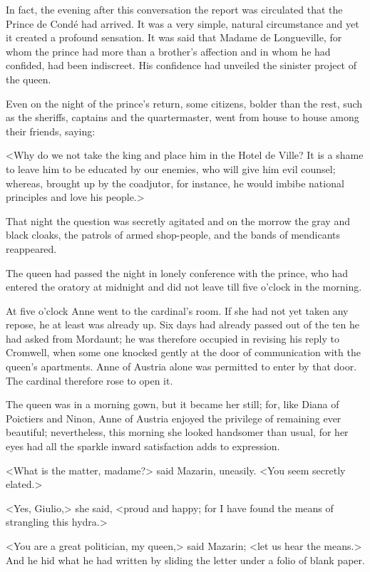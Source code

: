 In fact, the evening after this conversation the report was circulated that the Prince de Condé had arrived. It was a very simple, natural circumstance and yet it created a profound sensation. It was said that Madame de Longueville, for whom the prince had more than a brother's affection and in whom he had confided, had been indiscreet. His confidence had unveiled the sinister project of the queen.

Even on the night of the prince's return, some citizens, bolder than the rest, such as the sheriffs, captains and the quartermaster, went from house to house among their friends, saying:

<Why do we not take the king and place him in the Hotel de Ville? It is a shame to leave him to be educated by our enemies, who will give him evil counsel; whereas, brought up by the coadjutor, for instance, he would imbibe national principles and love his people.>

That night the question was secretly agitated and on the morrow the gray and black cloaks, the patrols of armed shop-people, and the bands of mendicants reappeared.

The queen had passed the night in lonely conference with the prince, who had entered the oratory at midnight and did not leave till five o'clock in the morning.

At five o'clock Anne went to the cardinal's room. If she had not yet taken any repose, he at least was already up. Six days had already passed out of the ten he had asked from Mordaunt; he was therefore occupied in revising his reply to Cromwell, when some one knocked gently at the door of communication with the queen's apartments. Anne of Austria alone was permitted to enter by that door. The cardinal therefore rose to open it.

The queen was in a morning gown, but it became her still; for, like Diana of Poictiers and Ninon, Anne of Austria enjoyed the privilege of remaining ever beautiful; nevertheless, this morning she looked handsomer than usual, for her eyes had all the sparkle inward satisfaction adds to expression.

<What is the matter, madame?> said Mazarin, uneasily. <You seem secretly elated.>

<Yes, Giulio,> she said, <proud and happy; for I have found the means of strangling this hydra.>

<You are a great politician, my queen,> said Mazarin; <let us hear the means.> And he hid what he had written by sliding the letter under a folio of blank paper.

